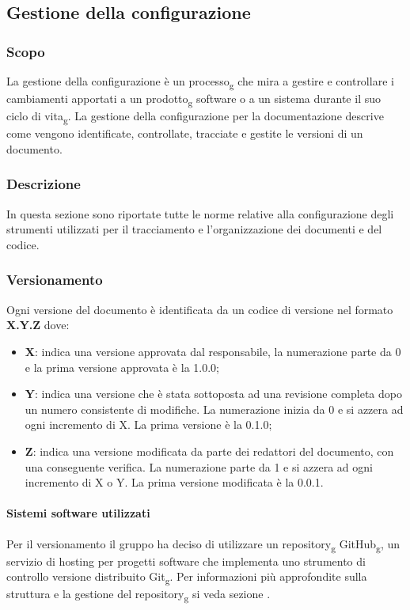 \subsection{Gestione della configurazione}
\subsubsection{Scopo}
La gestione della configurazione è un processo\textsubscript{g} che mira a gestire e controllare i cambiamenti apportati a un prodotto\textsubscript{g} software o a un sistema durante il suo ciclo di vita\textsubscript{g}. 
La gestione della configurazione per la documentazione descrive come vengono identificate, controllate, tracciate e gestite le versioni di un documento.
\subsubsection{Descrizione}
In questa sezione sono riportate tutte le norme relative alla configurazione degli strumenti utilizzati per il tracciamento e l’organizzazione dei documenti e del codice.
\subsubsection{Versionamento}
Ogni versione del documento è identificata da un codice di versione nel formato \textbf{X.Y.Z} dove:
\begin{itemize} 
    \item \textbf{X}: indica una versione approvata dal responsabile, la numerazione parte da 0
    e la prima versione approvata è la 1.0.0;
    \item \textbf{Y}: indica una versione che è stata sottoposta ad una revisione completa dopo un numero consistente di modifiche. 
    La numerazione inizia da 0 e si azzera ad ogni incremento di X. La prima versione è la 0.1.0;
    \item \textbf{Z}: indica una versione modificata da parte dei redattori del documento, con una conseguente verifica.
    La numerazione parte da 1 e si azzera ad ogni incremento di X o Y. La prima versione modificata è la 0.0.1.
\end{itemize}

\paragraph{Sistemi software utilizzati}
Per il versionamento il gruppo ha deciso di utilizzare un repository\textsubscript{g} GitHub\textsubscript{g}, un servizio di hosting per progetti software che implementa uno strumento di controllo versione distribuito Git\textsubscript{g}.
Per informazioni più approfondite sulla struttura e la gestione del repository\textsubscript{g} si veda sezione .